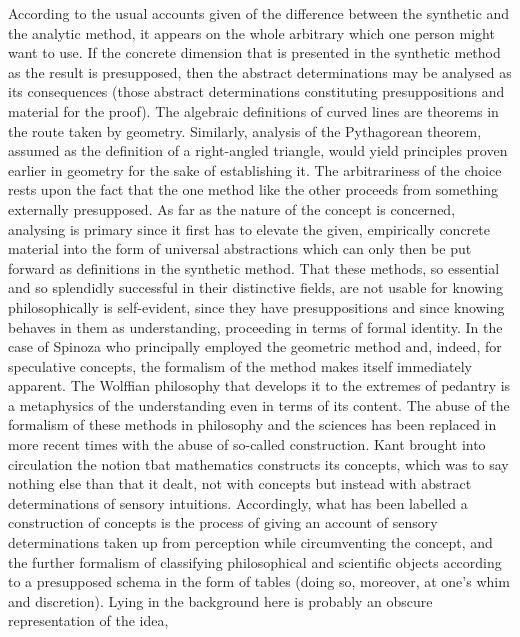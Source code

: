     According to the usual accounts given of the difference between the
    synthetic and the analytic method, it appears on the whole arbitrary
    which one person might want to use.
    If the concrete dimension that is presented in the synthetic method
    as the result is presupposed, then the abstract determinations may be analysed as its consequences
    (those abstract determinations constituting presuppositions and
    material for the proof).
    The algebraic definitions of curved lines are theorems in
    the route taken by geometry.
    Similarly, analysis of the Pythagorean theorem, assumed as
    the definition of a right-angled triangle, would yield principles
    proven earlier in geometry for the sake of establishing it.
    The arbitrariness of the choice rests upon the fact that
    the one method like the other proceeds from something externally presupposed.
    As far as the nature of the concept is concerned,
    analysing is primary since it first has to elevate the given,
    empirically concrete material into the form of universal abstractions
    which can only then be put forward as definitions in the synthetic method.
    That these methods, so essential and so splendidly successful in
    their distinctive fields, are not usable for knowing philosophically is
    self-evident, since they have presuppositions and since knowing
    behaves in them as understanding, proceeding in terms of formal identity.
    In the case of Spinoza who principally employed the
    geometric method and, indeed, for speculative concepts, the
    formalism of the method makes itself immediately apparent.
    The Wolffian philosophy that develops it to the extremes of pedantry is a
    metaphysics of the understanding even in terms of its content.
    The abuse of the formalism of these methods in philosophy and the
    sciences has been replaced in more recent times with the abuse of
    so-called construction.
    Kant brought into circulation the notion tbat mathematics constructs its concepts,
    which was to say nothing else than that it dealt, not with concepts but
    instead with abstract determinations of sensory intuitions.
    Accordingly, what has been labelled a construction of concepts is
    the process of giving an account of sensory determinations taken up from perception
    while circumventing the concept, and the further formalism of classifying
    philosophical and scientific objects according to a presupposed schema
    in the form of tables (doing so, moreover, at one's whim and discretion).
    Lying in the background here is probably an obscure representation of the idea,
